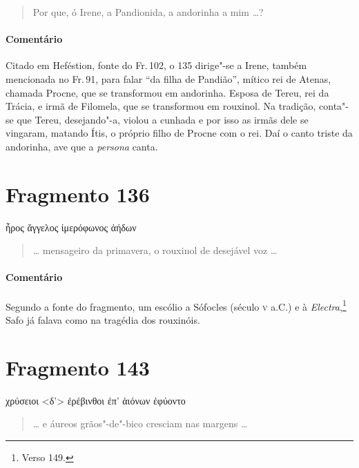 \begin{verse}
Por que, ó Irene, a Pandionida, a andorinha a mim \ldots{}?
\end{verse}

\medskip

{\paragraph{Comentário} Citado em Heféstion, fonte do Fr.\,102, o 135 dirige"-se a Irene, também mencionada no Fr.\,91, para falar ``da filha de Pandião'', mítico rei de Atenas, chamada Procne, que se transformou em andorinha. Esposa de Tereu, rei da Trácia, e irmã de Filomela, que se transformou em rouxinol. Na tradição, conta"-se que Tereu, desejando"-a, violou a cunhada e por isso as irmãs dele se vingaram, matando Ítis, o próprio filho de Procne com o rei. Daí o canto triste da andorinha, ave que a \textit{persona} canta.}


\section{Fragmento 136}

\begin{gkverse}
ἦρος ἄγγελος ἰμερόφωνος ἀήδων
\end{gkverse}

\begin{verse}
\ldots{} mensageiro da primavera, o rouxinol de desejável voz \ldots{}
\end{verse}

\medskip

{\paragraph{Comentário} Segundo a fonte do fragmento, um escólio a Sófocles (século \textsc{v} a.C.) e à \textit{Electra},\footnote{Verso 149.} Safo já falava como na tragédia dos
rouxinóis.}

\section{Fragmento 143}

\begin{gkverse}
χρύσειοι <δ’> ἐρέβινθοι ἐπ’ ἀιόνων ἐφύοντο
\end{gkverse}

\begin{verse}
\ldots{} e áureos grãos"-de"-bico cresciam nas margens \ldots{}
\end{verse}

